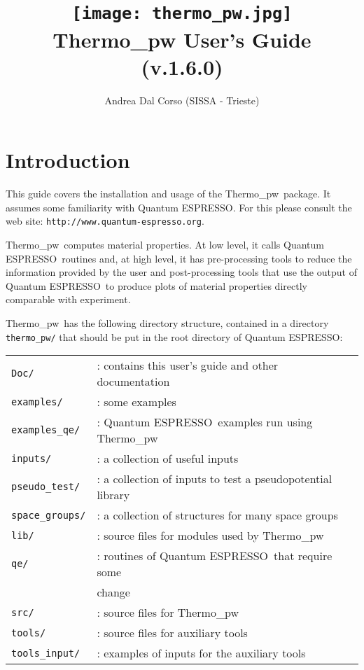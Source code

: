 \documentclass[12pt,a4paper,twoside]{report}
\def\version{1.6.0}
\def\qe{{\sc Quantum ESPRESSO}}
\def\thermo{{\sc Thermo\_pw}}
\begin{document}
 

\author{Andrea Dal Corso (SISSA - Trieste)}
\date{}

\title{
  \texttt{[image: thermo\_pw.jpg]} \\
  \vspace{3truecm}
  \Huge \color{dark-blue} {\sc Thermo}\_{\sc pw} User's Guide \\
  (v.\version)
}

\maketitle

\newpage

\tableofcontents

\newpage

{\color{dark-blue}\chapter{Introduction}}
\color{black}
This guide covers the installation and usage of the \thermo\ package. 
It assumes some familiarity with \qe. 
For this please consult the web site: \texttt{http://www.quantum-espresso.org}.

\thermo\ computes material properties.
At low level, it calls \qe\ routines and, at high level, it has pre-processing
tools to reduce the information provided by the user and
post-processing tools that use the output of \qe\ to produce plots of material 
properties directly comparable with experiment. 

\thermo\ has the following directory structure, contained in a directory 
\texttt{thermo\_pw/} that should be put in the root directory of \qe:

\begin{tabular}{ll}
\texttt{Doc/}      & : contains this user's guide and other documentation\\
\texttt{examples/} & : some examples \\
\texttt{examples\_qe/} & : \qe\ examples run using 
\thermo \\
\texttt{inputs/}   & : a collection of useful inputs \\
\texttt{pseudo\_test/} & : a collection of inputs to test a pseudopotential library\\
\texttt{space\_groups/} & : a collection of structures for many space groups \\
\texttt{lib/}      & : source files for modules used by \thermo\ \\
\texttt{qe/}       & : routines of \qe\ that require some \\
                   &   change \\
\texttt{src/}      & : source files for \thermo\ \\
\texttt{tools/}    & : source files for auxiliary tools \\
\texttt{tools\_input/}  & : examples of inputs for the auxiliary tools \\
\end{tabular}\\
\end{document}

